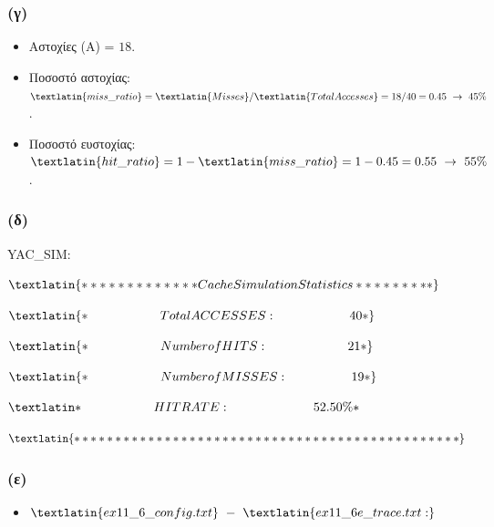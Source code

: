 \documentclass{article}
\begin{document}
\subsubsection*{\textbf{(γ)}}

\begin{itemize}
    \item {Αστοχίες} (\textlatin{A}) = \( 18 \).
    \item {Ποσοστό αστοχίας}: \(\textlatin{miss\_ratio} = {\textlatin{Misses}}/{\textlatin{Total Accesses}} = {18}/{40} = 0.45 \ \rightarrow \ 45\%\).
    \item {Ποσοστό ευστοχίας}: \(\textlatin{hit\_ratio} = 1 - \textlatin{miss\_ratio} = 1 - 0.45 = 0.55 \ \rightarrow \ 55\%\).
\end{itemize}

\subsubsection*{\textbf{(δ)}}

\textlatin{YAC\_SIM:}

$
\textlatin
{
************* Cache Simulation Statistics *********
}
$

$
\textlatin
{
* \hspace{2cm}            Total ACCESSES :  \hspace{2.02cm}               40 *
}
$

$
\textlatin
{
*     \hspace{2cm}        Number of HITS :        \hspace{2.2cm}         21 *
}
$

$
\textlatin
{
*       \hspace{2cm}      Number of MISSES :        \hspace{1.75cm}       19 *
}
$

$
\textlatin
{
*      \hspace{2cm}       HIT RATE :          \hspace{2.3cm}         52.50\% *
}
$

$
\textlatin
{
***********************************************
}
$

\subsubsection*{\textbf{(ε)}}

\begin{itemize}
    \item $\textlatin{ex11\_6\_config.txt} \ - \ \textlatin{ex11\_6e\_trace.txt:}$
\end{itemize}
\end{document}
